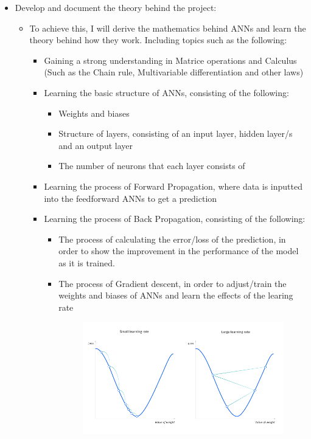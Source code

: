 \documentclass[10pt,a4paper]{article}
\begin{document}
\begin{itemize}
    \item Develop and document the theory behind the project:
    \begin{itemize}
        \item To achieve this, I will derive the mathematics behind ANNs and learn the theory behind how they work. Including topics such as the following:
        \begin{itemize}
            \item Gaining a strong understanding in Matrice operations and Calculus (Such as the Chain rule, Multivariable differentiation and other laws)
            \item Learning the basic structure of ANNs, consisting of the following:
            \begin{itemize}
                \item Weights and biases
                \item Structure of layers, consisting of an input layer, hidden layer/s and an output layer
                \item The number of neurons that each layer consists of
            \end{itemize}
            \item Learning the process of Forward Propagation, where data is inputted into the feedforward ANNs to get a prediction
            \item Learning the process of Back Propagation, consisting of the following:
            \begin{itemize}
                \item The process of calculating the error/loss of the prediction, in order to show the improvement in the performance of the model as it is trained.
                \item The process of Gradient descent, in order to adjust/train the weights and biases of ANNs and learn the effects of the learing rate
                      \begin{figure}[h!]
                      \centering
                      \includegraphics[width=1\textwidth]{./project-report/src/images/gradient-descent.png}

\end{figure}
\end{itemize}
\end{itemize}
\end{itemize}
\end{itemize}
\end{document}
